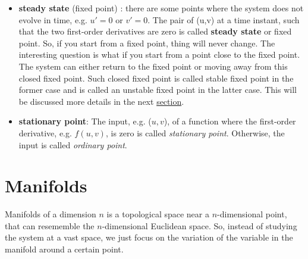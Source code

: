 \begin{itemize}



\item {\bf steady state} (fixed point) : there are some points where
  the system does not evolve in time, e.g. $u'=0$ or $v'=0$. The pair
  of (u,v) at a time instant, such that the two first-order
  derivatives are zero is called {\bf steady state} or fixed
  point. So, if you start from a fixed point, thing will never
  change. The interesting question is what if you start from a point
  close to the fixed point. The system can either return to the fixed
  point or moving away from this closed fixed point. Such closed fixed
  point is called stable fixed point in the former case and is called
  an unstable fixed point in the latter case.  This will be discussed
  more details in the next
  \hyperref[sec:phase-plane-analysis-1]{section}.

\item {\bf stationary point}: The input, e.g. ($u,v$), of a function
  where the first-order derivative, e.g. $f(u,v)$, is zero is called
  {\it stationary point}. Otherwise, the input is called
  {\it ordinary point}.

\end{itemize}


\section{Manifolds}

Manifolds of a dimension $n$ is a topological space near a 
$n$-dimensional point, that can resememble the $n$-dimensional Euclidean space.
So, instead of studying the system at a vast space, we just focus on the
variation of the variable in the manifold around a certain point. 


